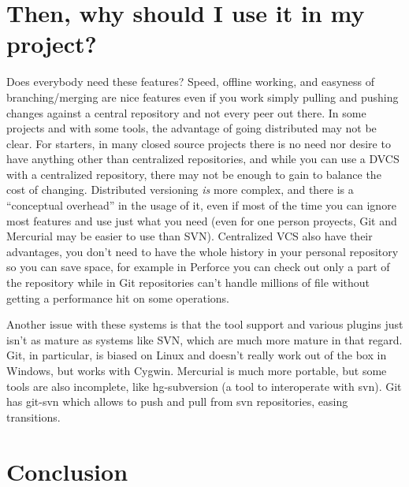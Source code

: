 \documentclass[%
	final,
	notitlepage,
	narroweqnarray,
	inline,
	twoside,
	]{ieee}
\begin{document}
\section{Then, why should I use it in my project?}
Does everybody need these features? Speed, offline working, 
and easyness of branching/merging are nice features even if you work simply pulling 
and pushing changes against a central repository and not every peer out there. In some 
projects and with some tools, the advantage of going distributed may not be clear. 
For starters, in many closed source projects there is no need nor desire to have anything
other than centralized repositories, and while you can use a DVCS with a centralized
repository, there may not be enough to gain to balance the cost of changing. Distributed 
versioning \emph{is} more complex, and there is a ``conceptual overhead'' in the usage 
of it, even if most of the time you can ignore most features and use just what you need 
(even for one person proyects, Git and Mercurial may be easier to use than SVN).
Centralized VCS also have their advantages, you don't need to have the whole history in your 
personal repository so you can save space, for example in Perforce you can check out only a part of the 
repository\cite{perforceclientspec} while in Git repositories can't handle millions of file 
without getting a performance hit on some operations\cite{linusgit}.

Another issue with these systems is that the tool support and various plugins just isn't as 
mature as systems like SVN, which are much more mature in that regard. Git, in particular, is 
biased on Linux and doesn't really work out of the box in Windows, but works with Cygwin. 
Mercurial is much more portable, but some tools are also incomplete, like hg-subversion (a tool 
to interoperate with svn). Git has git-svn which allows to push and pull from svn repositories, 
easing transitions.



\section{Conclusion}
\end{document}

